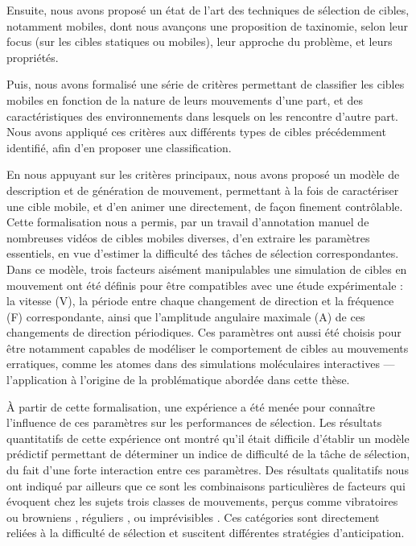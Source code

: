 	Ensuite, nous avons proposé un état de l'art des techniques de sélection de cibles, notamment mobiles, dont nous avançons une proposition de taxinomie, selon leur focus (sur les cibles statiques ou mobiles), leur approche du problème, et leurs propriétés.
	
	Puis, nous avons formalisé une série de critères permettant de classifier les cibles mobiles en fonction de la nature de leurs mouvements d'une part, et des caractéristiques des environnements dans lesquels on les rencontre d'autre part. Nous avons appliqué ces critères aux différents types de cibles précédemment identifié, afin d'en proposer une classification.
	
	En nous appuyant sur les critères principaux, nous avons proposé un modèle de description et de génération de mouvement, permettant à la fois de caractériser une cible mobile, et d'en animer une directement, de façon finement contrôlable. Cette formalisation nous a permis, par un travail d'annotation manuel de nombreuses vidéos de cibles mobiles diverses, d'en extraire les paramètres essentiels, en vue d'estimer la difficulté des tâches de sélection correspondantes. Dans ce modèle, trois facteurs aisément manipulables une simulation de cibles en mouvement ont été définis pour être compatibles avec une étude expérimentale : la vitesse (V), la période entre chaque changement de direction et la fréquence (F) correspondante, ainsi que l'amplitude angulaire maximale (A) de ces changements de direction périodiques. Ces paramètres ont aussi été choisis pour être notamment capables de modéliser le comportement de cibles au mouvements erratiques, comme les atomes dans des simulations moléculaires interactives --- l’application à l’origine de la problématique abordée dans cette thèse.

	À partir de cette formalisation, une expérience a été menée pour connaître l'influence de ces paramètres sur les performances de sélection. Les résultats quantitatifs de cette expérience ont montré qu'il était difficile d'établir un modèle prédictif permettant de déterminer un indice de difficulté de la tâche de sélection, du fait d'une forte interaction entre ces paramètres. Des résultats qualitatifs nous ont indiqué par ailleurs que ce sont les combinaisons particulières de facteurs qui évoquent chez les sujets trois classes de mouvements, perçus comme \og vibratoires \fg{} ou \og browniens \fg{}, \og réguliers \fg{}, ou \og imprévisibles \fg{}. Ces catégories sont directement reliées à la difficulté de sélection et suscitent différentes stratégies d'anticipation.

